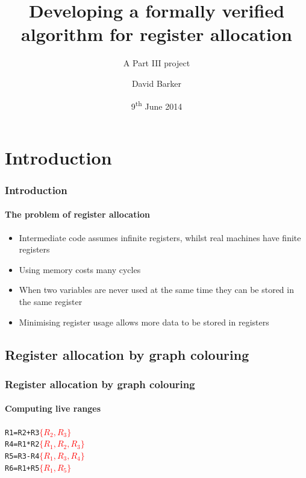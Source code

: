 \documentclass{beamer}
\title[Verified register allocation]{Developing a formally verified algorithm for register allocation}
\subtitle{A Part III project}
\author{David Barker}
\date{9\textsuperscript{th} June 2014}
\begin{document}
\frame{\titlepage}

\section{Introduction}

\begin{frame}
\frametitle{Introduction}
\framesubtitle{The problem of register allocation}

\begin{itemize}
	\item Intermediate code assumes infinite registers, whilst real machines have finite registers
	\item Using memory costs many cycles
	\item When two variables are never used at the same time they can be stored in the same register
	\item Minimising register usage allows more data to be stored in registers
\end{itemize}
\end{frame}

\subsection{Register allocation by graph colouring}
\begin{frame}[containsverbatim]
\frametitle{Register allocation by graph colouring}
\framesubtitle{Computing live ranges}
\begin{center}
\begin{alltt}
R1 = R2 + R3  \textcolor{red}{\(\{R_2, R_3\}\)}
R4 = R1 * R2  \textcolor{red}{\(\{R_1, R_2, R_3\}\)}
R5 = R3 - R4  \textcolor{red}{\(\{R_1, R_3, R_4\}\)}
R6 = R1 + R5  \textcolor{red}{\(\{R_1, R_5\}\)}
\end{alltt}
\end{center}
\end{frame}
\end{document}
